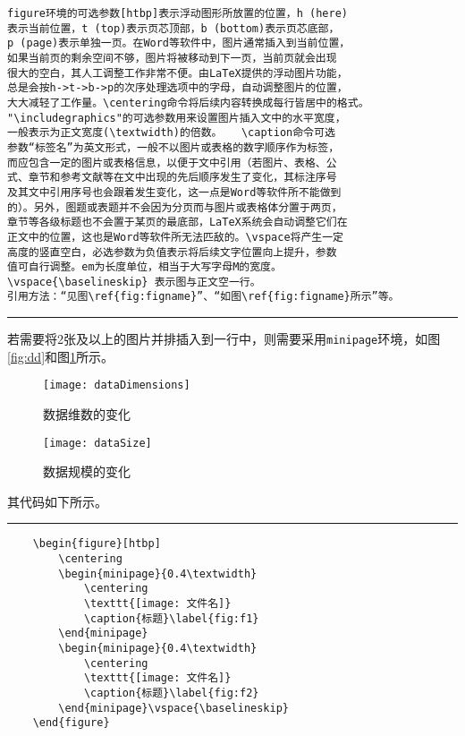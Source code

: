 \begin{verbatim}
figure环境的可选参数[htbp]表示浮动图形所放置的位置，h (here)
表示当前位置，t (top)表示页芯顶部，b (bottom)表示页芯底部，
p (page)表示单独一页。在Word等软件中，图片通常插入到当前位置，
如果当前页的剩余空间不够，图片将被移动到下一页，当前页就会出现
很大的空白，其人工调整工作非常不便。由LaTeX提供的浮动图片功能，
总是会按h->t->b->p的次序处理选项中的字母，自动调整图片的位置，
大大减轻了工作量。\centering命令将后续内容转换成每行皆居中的格式。
"\includegraphics"的可选参数用来设置图片插入文中的水平宽度，
一般表示为正文宽度(\textwidth)的倍数。	\caption命令可选
参数“标签名”为英文形式，一般不以图片或表格的数字顺序作为标签，
而应包含一定的图片或表格信息，以便于文中引用（若图片、表格、公
式、章节和参考文献等在文中出现的先后顺序发生了变化，其标注序号
及其文中引用序号也会跟着发生变化，这一点是Word等软件所不能做到
的）。另外，图题或表题并不会因为分页而与图片或表格体分置于两页，
章节等各级标题也不会置于某页的最底部，LaTeX系统会自动调整它们在
正文中的位置，这也是Word等软件所无法匹敌的。\vspace将产生一定
高度的竖直空白，必选参数为负值表示将后续文字位置向上提升，参数
值可自行调整。em为长度单位，相当于大写字母M的宽度。
\vspace{\baselineskip} 表示图与正文空一行。
引用方法：“见图\ref{fig:figname}”、“如图\ref{fig:figname}所示”等。
\end{verbatim}

\noindent\hrule\vspace{1em}

若需要将2张及以上的图片并排插入到一行中，则需要采用\verb|minipage|环境，如图\ref{fig:dd}和图\ref{fig:ds}所示。
\begin{figure}[htbp]
	\centering
	\begin{minipage}{0.4\textwidth}
		\centering
		\texttt{[image: dataDimensions]}
		\caption{数据维数的变化}\label{fig:dd}
	\end{minipage}
	\begin{minipage}{0.4\textwidth}
		\centering
		\texttt{[image: dataSize]}
		\caption{数据规模的变化}\label{fig:ds}
	\end{minipage}
	\vspace{\baselineskip}
\end{figure}

其代码如下所示。

\vspace{1em}\noindent\hrule
\begin{verbatim}
	\begin{figure}[htbp]
		\centering
		\begin{minipage}{0.4\textwidth}
			\centering
			\texttt{[image: 文件名]}
			\caption{标题}\label{fig:f1}
		\end{minipage}
		\begin{minipage}{0.4\textwidth}
			\centering
			\texttt{[image: 文件名]}
			\caption{标题}\label{fig:f2}
		\end{minipage}\vspace{\baselineskip}
	\end{figure}
\end{verbatim}

